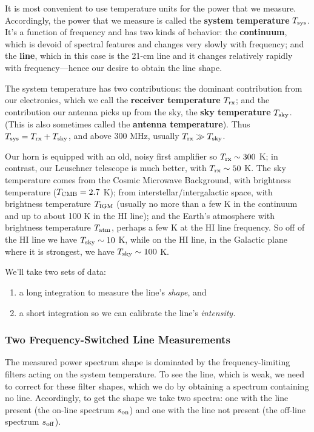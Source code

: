 \documentclass[11pt,preprint]{aastex}
\begin{document}
It is most convenient to use temperature units for the power
that we measure. Accordingly, the power that we measure is called the
{\bf system temperature} $T_{\rm sys}$. It's a function of frequency and has two
kinds of behavior: the {\bf continuum}, which is devoid of spectral features
and changes very slowly with frequency; and the {\bf line}, which in this
case is the 21-cm line and it changes relatively rapidly with frequency---hence our
desire to obtain the line shape.

The system temperature has two contributions: the dominant contribution
  from our electronics, which we call the {\bf receiver temperature} $T_{\rm rx}$;
  and the contribution our antenna picks up from the sky, the {\bf sky temperature}
  $T_{\rm sky}$.  (This is also sometimes called the {\bf antenna temperature}).  
 Thus $T_{\rm sys}= T_{\rm rx} + T_{\rm sky}$, and above 300 MHz, usually $T_{\rm rx} \gg T_{\rm sky}$. 

Our horn is equipped with an old, noisy first amplifier so $T_{\rm rx} \sim
300$ K; in contrast, our Leuschner telescope is much better, with $T_{\rm rx}
\sim 50$ K. The sky temperature comes from the Cosmic Microwave Background,
with brightness temperature ($T_{\rm CMB} = 2.7$ K); from
interstellar/intergalactic space, with brightness temperature
$T_{\rm IGM}$ (usually no more than a few K in the continuum and up to
about 100 K in the HI line); and the Earth's atmosphere with brightness
temperature $T_{\rm atm}$, perhaps a few K at the HI line frequency. So
off of the HI line we have $T_{\rm sky} \sim 10$ K, while on the HI line, in the
Galactic plane where it is strongest, we have $T_{\rm sky} \sim 100$ K.

We'll take two sets of data:
\begin{enumerate}
\item a long integration to measure the line's
{\it shape}, and 
\item a short integration so we can calibrate the line's
{\it intensity.}
\end{enumerate}

\subsubsection{Two Frequency-Switched Line Measurements}

\noindent
The measured power spectrum shape is dominated by the
frequency-limiting filters acting on the system temperature. To see the
line, which is weak, we need to correct for these filter shapes, which
we do by obtaining a spectrum containing no line. Accordingly, to get
the shape we take two spectra: one with the line present (the on-line
spectrum $s_{\rm on}$) and one with the line not present (the off-line
spectrum $s_{\rm off}$).
\end{document}
